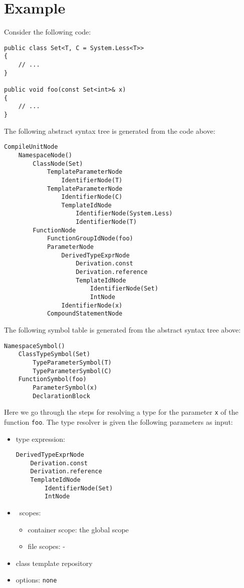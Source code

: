 \documentclass[a4paper,oneside,11pt]{book}
\theoremstyle{definition}
\begin{document}
\clearpage
\section{Example}

Consider the following code:

\lstset{language=Cmajor}
\begin{lstlisting}
public class Set<T, C = System.Less<T>>
{
    // ...
}

public void foo(const Set<int>& x)
{
    // ...
}
\end{lstlisting}

\begin{flushleft}
The following abstract syntax tree is generated from the code above:
\begin{verbatim}
CompileUnitNode
    NamespaceNode()
        ClassNode(Set)
            TemplateParameterNode
                IdentifierNode(T)
            TemplateParameterNode
                IdentifierNode(C)
                TemplateIdNode
                    IdentifierNode(System.Less)
                    IdentifierNode(T)
        FunctionNode
            FunctionGroupIdNode(foo)
            ParameterNode
                DerivedTypeExprNode
                    Derivation.const
                    Derivation.reference
                    TemplateIdNode
                        IdentifierNode(Set)
                        IntNode
                IdentifierNode(x)
            CompoundStatementNode
\end{verbatim}

The following symbol table is generated from the abstract syntax tree above:
\begin{verbatim}
NamespaceSymbol()
    ClassTypeSymbol(Set)
        TypeParameterSymbol(T)
        TypeParameterSymbol(C)
    FunctionSymbol(foo)
        ParameterSymbol(x)
        DeclarationBlock
\end{verbatim}

Here we go through the steps for resolving a type for the parameter \verb|x| of the function \verb|foo|.
The type resolver is given the following parameters as input:
\begin{itemize}
\item
type expression:
\begin{verbatim}
DerivedTypeExprNode
    Derivation.const
    Derivation.reference
    TemplateIdNode
        IdentifierNode(Set)
        IntNode
\end{verbatim}
\item\
scopes:
\begin{itemize}
\item
container scope: the global scope
\item
file scopes: -
\end{itemize}
\item
class template repository
\item
options: \verb|none|
\end{itemize}


\end{flushleft}
\end{document}
